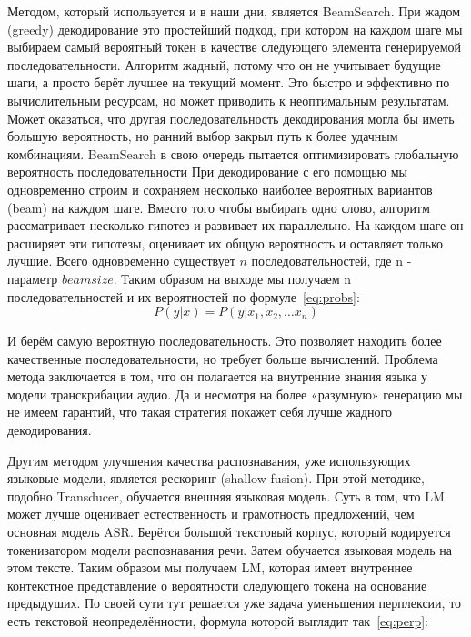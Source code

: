 Методом, который используется и в наши дни, является BeamSearch.
При жадом (greedy) декодирование это простейший подход, при котором на каждом шаге мы выбираем самый вероятный токен в качестве следующего элемента генерируемой последовательности.
Алгоритм жадный, потому что он не учитывает будущие шаги, а просто берёт лучшее на текущий момент.
Это быстро и эффективно по вычислительным ресурсам, но может приводить к неоптимальным результатам.
Может оказаться, что другая последовательность декодирования могла бы иметь большую вероятность, но ранний выбор закрыл путь к более удачным комбинациям.
BeamSearch в свою очередь пытается оптимизировать глобальную вероятность последовательности
При декодирование с его помощью мы одновременно строим и сохраняем несколько наиболее вероятных вариантов (beam) на каждом шаге.
Вместо того чтобы выбирать одно слово, алгоритм рассматривает несколько гипотез и развивает их параллельно.
На каждом шаге он расширяет эти гипотезы, оценивает их общую вероятность и оставляет только лучшие.
Всего одновременно существует $n$ последовательностей, где n - параметр $beam size$.
Таким образом на выходе мы получаем n последовательностей и их вероятностей по формуле~\ref{eq:probs}:
\begin{equation}
  P(y|x) = P(y|x_1,x_2,\dots x_n)
  \label{eq:probs}
\end{equation}

И берём самую вероятную последовательность.
Это позволяет находить более качественные последовательности, но требует больше вычислений.
Проблема метода заключается в том, что он полагается на внутренние знания языка у модели транскрибации аудио.
Да и несмотря на более «разумную» генерацию мы не имеем гарантий, что такая стратегия покажет себя лучше жадного декодирования.

Другим методом улучшения качества распознавания, уже использующих языковые модели, является рескоринг (shallow fusion).
При этой методике, подобно Transducer, обучается внешняя языковая модель.
Суть в том, что LM может лучше оценивает естественность и грамотность предложений, чем основная модель ASR.
Берётся большой текстовый корпус, который кодируется токенизатором модели распознавания речи.
Затем обучается языковая модель на этом тексте.
Таким образом мы получаем LM, которая имеет внутреннее контекстное представление о вероятности следующего токена на основание предыдуших.
По своей сути тут решается уже задача уменьшения перплексии, то есть текстовой неопределённости, формула которой выглядит так~\ref{eq:perp}:

